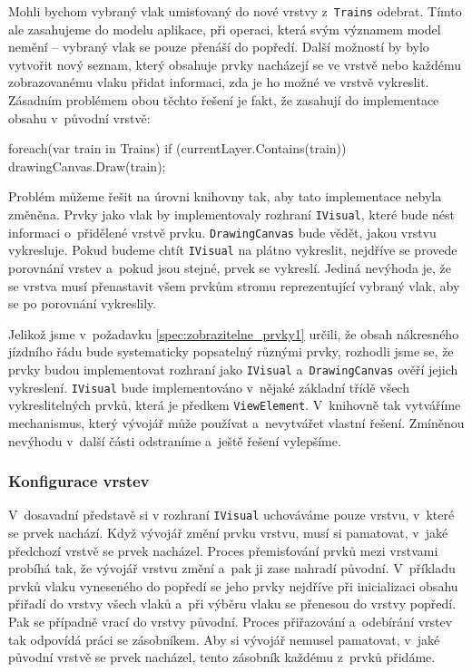 Mohli bychom vybraný vlak umisťovaný do nové vrstvy z~\texttt{Trains} odebrat. Tímto ale zasahujeme do modelu aplikace, při operaci, která svým významem model nemění -- vybraný vlak se pouze přenáší do popředí. Další možností by bylo vytvořit nový seznam, který obsahuje prvky nacházejí se ve vrstvě nebo každému zobrazovanému vlaku přidat informaci, zda je ho možné ve vrstvě vykreslit. Zásadním problémem obou těchto řešení je fakt, že zasahují do implementace obsahu v~původní vrstvě:

\begin{csharpcode}
foreach(var train in Trains) {
	if (currentLayer.Contains(train)) {
		drawingCanvas.Draw(train);	
	}	
}
\end{csharpcode}

Problém můžeme řešit na úrovni knihovny tak, aby tato implementace nebyla změněna. Prvky jako vlak by implementovaly rozhraní \texttt{IVisual}, které bude nést informaci o~přidělené vrstvě prvku. \texttt{DrawingCanvas} bude vědět, jakou vrstvu vykresluje. Pokud budeme chtít \texttt{IVisual} na plátno vykreslit, nejdříve se provede porovnání vrstev a~pokud jsou stejné, prvek se vykreslí. Jediná nevýhoda je, že se vrstva musí přenastavit všem prvkům stromu reprezentující vybraný vlak, aby se po porovnání vykreslily.

Jelikož jsme v~požadavku \ref{spec:zobrazitelne_prvky1} určili, že obsah nákresného jízdního řádu bude systematicky popsatelný různými prvky, rozhodli jsme se, že prvky budou implementovat rozhraní jako \texttt{IVisual} a~\texttt{DrawingCanvas} ověří jejich vykreslení. \texttt{IVisual} bude implementováno v~nějaké základní třídě všech vykreslitelných prvků, která je předkem \texttt{ViewElement}. V~knihovně tak vytváříme mechanismus, který vývojář může používat a~nevytvářet vlastní řešení. Zmíněnou nevýhodu v~další části odstraníme a~ještě řešení vylepšíme.

\pagebreak
\subsubsection*{Konfigurace vrstev}
V~dosavadní představě si v rozhraní \texttt{IVisual} uchováváme pouze vrstvu, \linebreak v~které se prvek nachází. Když vývojář změní prvku vrstvu, musí si pamatovat, v~jaké předchozí vrstvě se prvek nacházel. Proces přemisťování prvků mezi vrstvami probíhá tak, že vývojář vrstvu změní a~pak ji zase nahradí původní. V~příkladu prvků vlaku vyneseného do popředí se jeho prvky nejdříve při inicializaci obsahu přiřadí do vrstvy všech vlaků a~při výběru vlaku se přenesou do vrstvy popředí. Pak se případně vrací do vrstvy původní. Proces přiřazování a~odebírání vrstev tak odpovídá práci se zásobníkem. Aby si vývojář nemusel pamatovat, v~jaké původní vrstvě se prvek nacházel, tento zásobník každému z~prvků přidáme.

